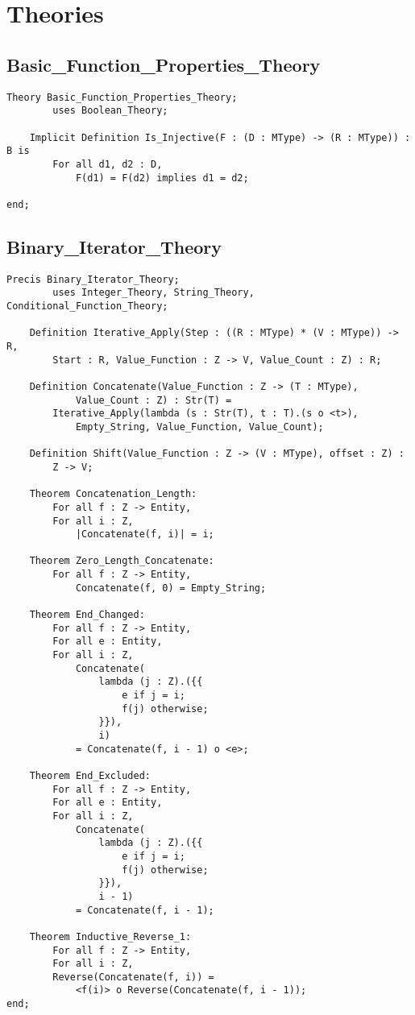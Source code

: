 

\section{Theories\label{apx:math}}

	\subsection{Basic\_Function\_Properties\_Theory}	%

\begin{lstlisting}[language=resolve]
Theory Basic_Function_Properties_Theory;
		uses Boolean_Theory;

	Implicit Definition Is_Injective(F : (D : MType) -> (R : MType)) : B is
		For all d1, d2 : D,
			F(d1) = F(d2) implies d1 = d2;

end;
\end{lstlisting}

	\subsection{Binary\_Iterator\_Theory}	%

\begin{lstlisting}[language=resolve]
Precis Binary_Iterator_Theory;
		uses Integer_Theory, String_Theory, Conditional_Function_Theory;

	Definition Iterative_Apply(Step : ((R : MType) * (V : MType)) -> R,
		Start : R, Value_Function : Z -> V, Value_Count : Z) : R;

	Definition Concatenate(Value_Function : Z -> (T : MType), 
			Value_Count : Z) : Str(T) = 
		Iterative_Apply(lambda (s : Str(T), t : T).(s o <t>),
			Empty_String, Value_Function, Value_Count);

	Definition Shift(Value_Function : Z -> (V : MType), offset : Z) : 
		Z -> V;

	Theorem Concatenation_Length:
		For all f : Z -> Entity,
		For all i : Z,
			|Concatenate(f, i)| = i;

	Theorem Zero_Length_Concatenate:
		For all f : Z -> Entity,
			Concatenate(f, 0) = Empty_String;

	Theorem End_Changed:
		For all f : Z -> Entity,
		For all e : Entity,
		For all i : Z,
			Concatenate(
				lambda (j : Z).({{
					e if j = i;
					f(j) otherwise;
				}}),
				i)
			= Concatenate(f, i - 1) o <e>;

	Theorem End_Excluded:
		For all f : Z -> Entity,
		For all e : Entity,
		For all i : Z,
			Concatenate(
				lambda (j : Z).({{
					e if j = i;
					f(j) otherwise;
				}}),
				i - 1)
			= Concatenate(f, i - 1);

	Theorem Inductive_Reverse_1:
		For all f : Z -> Entity,
		For all i : Z,
		Reverse(Concatenate(f, i)) = 
			<f(i)> o Reverse(Concatenate(f, i - 1));
end;
\end{lstlisting}

